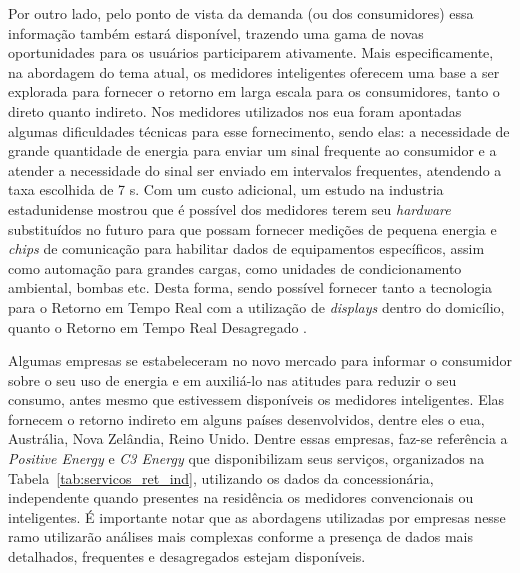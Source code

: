 Por outro lado, pelo ponto de vista da demanda (ou dos consumidores) essa 
informação também estará disponível, trazendo uma gama de novas oportunidades 
para os usuários participarem ativamente. Mais especificamente, na abordagem do
tema atual, os medidores inteligentes oferecem uma base
a ser explorada para fornecer o retorno em larga escala para os consumidores, 
tanto o direto quanto indireto. Nos medidores utilizados nos \gls{eua}
foram apontadas algumas dificuldades técnicas para esse fornecimento,
sendo elas: a necessidade de grande quantidade de energia para enviar
um sinal frequente ao consumidor e a
atender a necessidade do sinal ser enviado em intervalos frequentes,
atendendo a taxa escolhida de 7 s. Com um custo adicional, um estudo
na industria estadunidense mostrou que
é possível dos medidores terem seu \emph{hardware} substituídos 
no futuro para que possam fornecer medições de pequena energia e \emph{chips} 
de comunicação para habilitar dados de equipamentos específicos, assim como 
automação para grandes cargas, como unidades de condicionamento ambiental, 
bombas etc. Desta forma, sendo possível 
fornecer tanto a tecnologia para o Retorno em Tempo Real com a utilização de 
\emph{displays} dentro do domicílio, quanto o Retorno em Tempo Real Desagregado
\cite{aceee_2010_estudos_feedback}.

Algumas empresas se estabeleceram no novo mercado para informar o consumidor
sobre o seu uso de energia e em auxiliá-lo nas atitudes para reduzir o seu
consumo, antes mesmo que estivessem disponíveis os medidores inteligentes. 
Elas fornecem o retorno indireto em alguns países
desenvolvidos, dentre eles o \gls{eua}, Austrália, Nova Zelândia, Reino Unido.
Dentre essas empresas, faz-se referência a \emph{Positive Energy} 
\cite{opower_site} e \emph{C3 Energy} \cite{c3_site} que disponibilizam seus 
serviços, organizados na Tabela~\ref{tab:servicos_ret_ind}, 
utilizando os dados da concessionária, independente
quando presentes na residência os medidores convencionais ou inteligentes. 
É importante notar que as abordagens utilizadas por empresas nesse
ramo utilizarão análises mais complexas conforme a presença de dados
mais detalhados, frequentes e desagregados estejam disponíveis.

